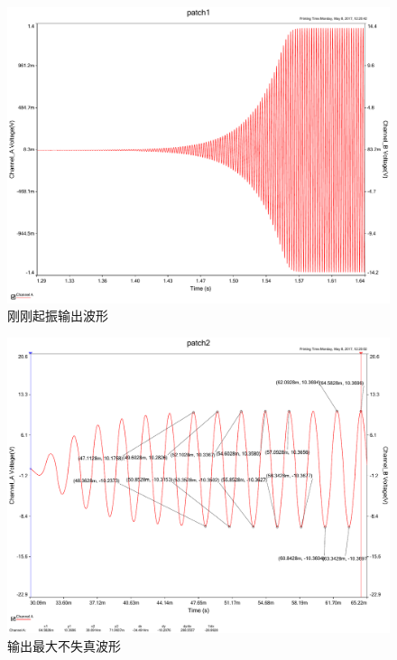 \documentclass[UTF8,a4paper]{paper}
\begin{document}
\begin{multicols}{2}
\begin {figure}[H]
\centering
\includegraphics [width=\columnwidth]{startac.pdf}
\caption{刚刚起振输出波形}
\label{ACstart}
\end {figure}
\begin{figure}[H]
\centering
\includegraphics[width=\columnwidth]{maxac.pdf}
\caption{输出最大不失真波形}
\label{ACmax}
\end{figure}
\end{multicols}
\end{document}
